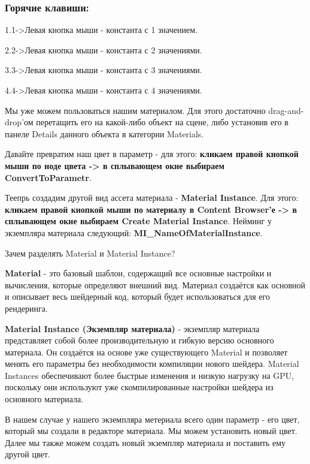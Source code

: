 \subsubsection*{Горячие клавиши:}

1.\hspace{1em}1->Левая кнопка мыши - константа с 1 значением.

2.\hspace{1em}2->Левая кнопка мыши - константа с 2 значениями.

3.\hspace{1em}3->Левая кнопка мыши - константа с 3 значениями.

4.\hspace{1em}4->Левая кнопка мыши - константа с 4 значениями.


Мы уже можем пользоваться нашим материалом. Для этого достаточно drag-and-drop'ом 
перетащить его на какой-либо объект на сцене, либо установив его в панеле
Details данного объекта в категории Materials.

Давайте превратим наш цвет в параметр - для этого: \textbf{кликаем правой кнопкой 
мыши по ноде цвета -> в сплывающем окне выбираем ConvertToParametr}.

Теепрь создадим другой вид ассета материала - \textbf{Material Instance}. 
Для этого: \textbf{кликаем правой кнопкой мыши по материалу в Content Browser'е 
-> в сплывающем окне выбираем Create Material Instance}. 
Нейминг у экземпляра материала следующий: \textbf{MI\_NameOfMaterialInstance}.

Зачем разделять Material и Material Instance?

\textbf{Material} - это базовый шаблон, содержащий все основные настройки и 
вычисления, которые определяют внешний вид. Материал создаётся как основной 
и описывает весь шейдерный код, который будет использоваться для его рендеринга.

\textbf{Material Instance (Экземпляр материала)} - экземпляр материала представляет 
собой более производительную и гибкую версию основного материала. 
Он создаётся на основе уже существующего Material и позволяет менять его параметры
без необходимости компиляции нового шейдера.
Material Instances обеспечивают более быстрые изменения и низкую нагрузку на GPU,
поскольку они используют уже скомпилированные настройки шейдера из основного 
материала.

В нашем случае у нашего экземпляра метериала всего один параметр - его цвет,
который мы создали в редакторе материала. Мы можем установить новый цвет. Далее
мы также можем создать новый экземпляр материала и поставить ему другой цвет.

